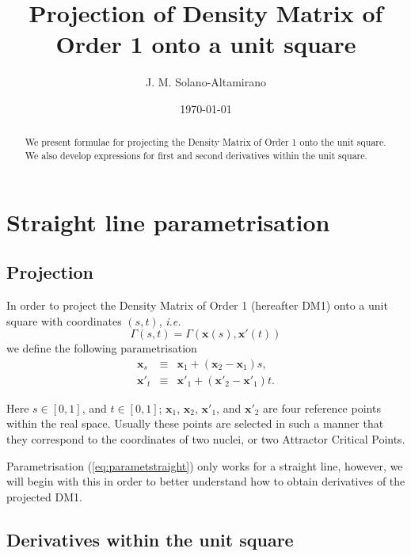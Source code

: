 \documentclass[11pt]{amsart}
\title{Projection of Density Matrix of Order 1 onto a unit square}
\author{J. M. Solano-Altamirano}
\date{\today}                                           %
\newcommand{\vecx}{\boldsymbol{x}}
\begin{document}
\begin{abstract}
We present formulae for projecting the Density Matrix of Order 1 onto the unit square. We also
develop expressions for first and second derivatives within the unit square.
\end{abstract}
\maketitle


\section{Straight line parametrisation}
\subsection{Projection}

In order to project the Density Matrix of Order 1 (hereafter DM1) onto a unit square with
coordinates $(s,t)$, \textit{i.e.}
%
\begin{equation}
   \Gamma(s,t)=\Gamma\left(\vecx(s),\vecx'(t)\right)
\end{equation}
%
we define the following parametrisation
\begin{subequations}\label{eq:parametstraight}
\begin{eqnarray}
\vecx_{s} & \equiv & \vecx_1+(\vecx_2-\vecx_1)s,\\
\vecx'_{t} & \equiv & \vecx'_1+(\vecx'_2-\vecx'_1)t.
\end{eqnarray}
\end{subequations}

Here $s\in[0,1]$, and $t\in[0,1]$; $\vecx_1$, $\vecx_2$, $\vecx'_1$, and $\vecx'_2$ are
four reference points within the real space. Usually these points are selected in such a manner
that they correspond to the coordinates of two nuclei, or two Attractor Critical Points.

Parametrisation (\ref{eq:parametstraight}) only works for a straight line, however, we will begin
with this in order to better understand how to obtain derivatives of the projected DM1.


\subsection{Derivatives within the unit square}
\end{document}
